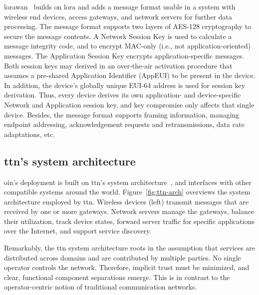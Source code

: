 \gls{lorawan}~\cite{lorawan-specs} builds on \gls{lora} and adds
a message format usable in a system with wireless end devices,
access gateways, and network servers for further data processing.
The message format
supports two layers of AES-128 cryptography to secure
the message contents. A Network Session Key is used to calculate a
message integrity code, and to encrypt MAC-only (i.e., not
application-oriented) messages. The Application Session Key encrypts
application-specific messages. Both session keys may derived in an
over-the-air activation procedure that assumes a pre-shared
Application Identifier (AppEUI) to be present in the device.
In addition, the device's globally unique EUI-64 address is used
for session key derivation. Thus, every device derives its own
application- and device-specific Network and Application session key,
and key compromise only affects that single device.
Besides, the message format supports framing information, managing
endpoint addressing, acknowledgement requests and retransmissions,
data rate adaptations, etc.


\subsection{\gls{ttn}'s system architecture}

\gls{oin}'s deployment is built on \gls{ttn}'s system architecture~\cite{ttn},
and interfaces with other compatible systems around the world.
Figure~\ref{fig:ttn-arch} overviews the system architecture employed
by \gls{ttn}. Wireless devices (left) transmit messages that are
received by one or more gateways. Network servers manage the gateways,
balance their utilization, track device states, forward server traffic
for specific applications over the Internet, and support service discovery.

Remarkably, the \gls{ttn} system architecture roots in the assumption
that services are distributed across domains and are contributed
by multiple parties. No single operator controls the network.
Therefore, implicit trust must be minimized, and clear, functional
component separations emerge.
This is in contrast to the operator-centric notion of traditional
communication networks.

